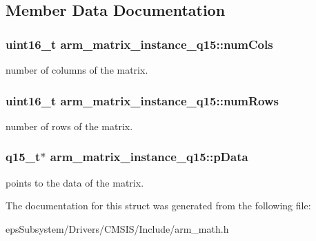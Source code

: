 \subsection{Member Data Documentation}
\hypertarget{structarm__matrix__instance__q15_acbbce67ba058d8e1c867c71d57288c97}{
\subsubsection[{num\-Cols}]{\setlength{\rightskip}{0pt plus 5cm}uint16\-\_\-t arm\-\_\-matrix\-\_\-instance\-\_\-q15\-::num\-Cols}}\label{structarm__matrix__instance__q15_acbbce67ba058d8e1c867c71d57288c97}
number of columns of the matrix. \hypertarget{structarm__matrix__instance__q15_a9bac6ed54be287c4d4f01a1a28be65f5}{
\subsubsection[{num\-Rows}]{\setlength{\rightskip}{0pt plus 5cm}uint16\-\_\-t arm\-\_\-matrix\-\_\-instance\-\_\-q15\-::num\-Rows}}\label{structarm__matrix__instance__q15_a9bac6ed54be287c4d4f01a1a28be65f5}
number of rows of the matrix. \hypertarget{structarm__matrix__instance__q15_a6da33a5553e634787d0f515cf8d724af}{
\subsubsection[{p\-Data}]{\setlength{\rightskip}{0pt plus 5cm}q15\-\_\-t$\ast$ arm\-\_\-matrix\-\_\-instance\-\_\-q15\-::p\-Data}}\label{structarm__matrix__instance__q15_a6da33a5553e634787d0f515cf8d724af}
points to the data of the matrix. 

The documentation for this struct was generated from the following file\-:\begin{DoxyCompactItemize}
\item 
eps\-Subsystem/\-Drivers/\-C\-M\-S\-I\-S/\-Include/arm\-\_\-math.\-h\end{DoxyCompactItemize}
